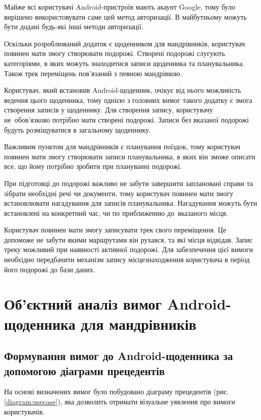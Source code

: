 \documentclass[../main.tex]{subfiles}
\begin{document}
Майже всі користувачі Android-пристроїв мають акаунт Google, тому було вирішено використовувати саме цей метод авторизації. В майбутньому можуть бути додані будь-які інші методи авторизації.

Оскільки розроблюваний додаток є щоденником для мандрівників, користувач повинен мати змогу створювати подорожі. Створені подорожі слугують категоріями, в яких можуть знаходитися записи щоденника та планувальника. Також трек переміщень пов'язаний з певною мандрівкою.

Користувач, який встановив Android-щоденник, очікує від нього можливість ведення цього щоденника, тому однією з головних вимог такого додатку є змога створення записів у щоденнику. Для створення запису, користувачу не~обов'язково потрібно мати створені подорожі. Записи без вказаної подорожі будуть розміщуватися в загальному щоденнику.

Важливим пунктом для мандрівників є планування поїздок, тому користувач повинен мати змогу створювати записи планувальника, в яких він зможе описати все, що йому потрібно зробити при плануванні подорожі.

При підготовці до подорожі важливо не забути завершити заплановані справи та зібрати необхідні речі чи документи, тому користувач повинен мати змогу встановлювати нагадування для записів планувальника. Нагадування можуть бути встановлені на конкретний час, чи по приближенню до~вказаного місця.

Користувач повинен мати змогу записувати трек свого переміщення. Це допоможе не забути якими маршрутами він рухався, та  які місця відвідав. Запис треку можливий при наявності активної подорожі. Для забезпечення цієї вимоги необхідно передбачити механізм запису місцезнаходження користувача в період його подорожі до бази даних.

\section{Об'єктний аналіз вимог Android-щоденника для мандрівників}

\subsection{Формування вимог до Android-щоденника за допомогою діаграми прецедентів}
На основі визначених вимог було побудовано діаграму прецедентів (рис. \ref{diagram:usecase}), яка дозволить отримати візуальне уявлення про вимоги користувачів.
\end{document}
